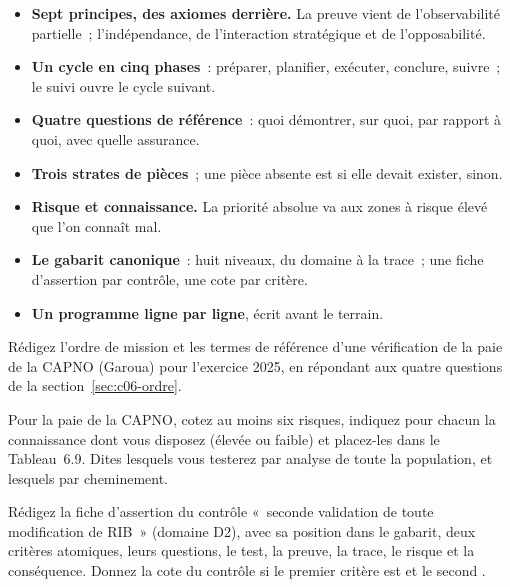 \separateur

\begin{boxresume}
\begin{itemize}
    \item \textbf{Sept principes, des axiomes derrière.} La preuve vient de
          l'observabilité partielle~; l'indépendance, de l'interaction
          stratégique et de l'opposabilité.
    \item \textbf{Un cycle en cinq phases}~: préparer, planifier, exécuter,
          conclure, suivre~; le suivi ouvre le cycle suivant.
    \item \textbf{Quatre questions de référence}~: quoi démontrer, sur quoi,
          par rapport à quoi, avec quelle assurance.
    \item \textbf{Trois strates de pièces}~; une pièce absente est \NON{} si
          elle devait exister, \NEK{} sinon.
    \item \textbf{Risque et connaissance.} La priorité absolue va aux zones
          à risque élevé que l'on connaît mal.
    \item \textbf{Le gabarit canonique}~: huit niveaux, du domaine à la
          trace~; une fiche d'assertion par contrôle, une cote par critère.
    \item \textbf{Un programme ligne par ligne}, écrit avant le terrain.
\end{itemize}
\end{boxresume}

\begin{boxexo}[title={\ding{45}\quad Exercice~6.1. Un ordre de mission \niveaubase}]
Rédigez l'ordre de mission et les termes de référence d'une vérification
de la paie de la CAPNO (Garoua) pour l'exercice 2025, en répondant aux
quatre questions de la section~\ref{sec:c06-ordre}.
\end{boxexo}

\begin{boxexo}[title={\ding{45}\quad Exercice~6.2. Risque et connaissance \niveaumoyen}]
Pour la paie de la CAPNO, cotez au moins six risques, indiquez pour chacun
la connaissance dont vous disposez (élevée ou faible) et placez-les dans le
Tableau~6.9. Dites lesquels vous testerez par analyse de toute la
population, et lesquels par cheminement.
\end{boxexo}

\begin{boxexo}[title={\ding{45}\quad Exercice~6.3. Une fiche d'assertion \niveaumoyen}]
Rédigez la fiche d'assertion du contrôle «~seconde validation de toute
modification de RIB~» (domaine D2), avec sa position dans le gabarit, deux
critères atomiques, leurs questions, le test, la preuve, la trace, le
risque et la conséquence. Donnez la cote du contrôle si le premier critère
est \OUI{} et le second \NEK{}.
\end{boxexo}

